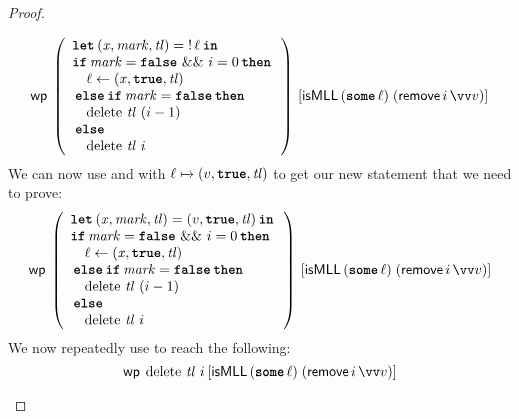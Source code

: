 \documentclass[thesis.tex]{subfiles}
\begin{document}
\begin{proof}
\begin{description}
              \[\wpre{
                      \left(
                      \begin{array}{l}
                              \Let (\lvar, \langv{mark}, \tl) = \deref \loc in  \\
                              \If \langv{mark} = \False\ \&\&\ \iindex = 0 then \\
                              \quad \loc \gets (\lvar, \True, \tl)              \\
                              \Else \If \langv{mark} = \False then              \\
                              \quad \MLLdelete\,\tl\ (\iindex - 1)              \\
                              \Else                                             \\
                              \quad \MLLdelete\,\tl\ \iindex
                          \end{array}
                      \right)
                  }{\isMLL\, (\Some \loc)\; (\textlog{remove}\, \iindex\, \vect{v})}\]
              We can now use  and  with $\loc \fmapsto (\val, \True, \tl)$ to get our new statement that we need to prove:
              \[
                  \wpre{\left(
                      \begin{array}{l}
                              \Let (\lvar, \langv{mark}, \tl) = (\val, \True, \tl) in \\
                              \If \langv{mark} = \False\ \&\&\ \iindex = 0 then       \\
                              \quad \loc \gets (\lvar, \True, \tl)                    \\
                              \Else \If \langv{mark} = \False then                    \\
                              \quad \MLLdelete\,\tl\ (\iindex - 1)                    \\
                              \Else                                                   \\
                              \quad \MLLdelete\,\tl\ \iindex
                          \end{array}
                      \right)}{\isMLL\, (\Some \loc)\; (\textlog{remove}\, \iindex\, \vect{v})}
              \]
              We now repeatedly use  to reach the following:
              \[
                  \wpre{\MLLdelete\,\tl\ \iindex}{\isMLL\, (\Some \loc)\; (\textlog{remove}\, \iindex\, \vect{\val})}
\]
\end{description}
\end{proof}
\end{document}
